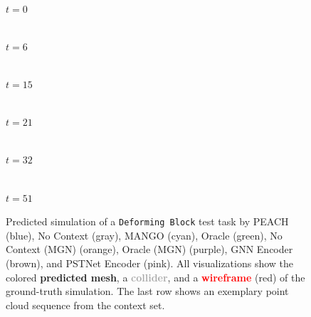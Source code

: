 \begin{figure}[p]
    \begin{minipage}[c]{0.158\textwidth}\centering
        \\[2pt]
        \footnotesize$t{=}0$
    \end{minipage}%
    \begin{minipage}[c]{0.158\textwidth}\centering
        \\[2pt]
        \footnotesize$t{=}6$
    \end{minipage}%
    \begin{minipage}[c]{0.158\textwidth}\centering
        \\[2pt]
        \footnotesize$t{=}15$
    \end{minipage}%
    \begin{minipage}[c]{0.158\textwidth}\centering
        \\[2pt]
        \footnotesize$t{=}21$
    \end{minipage}%
    \begin{minipage}[c]{0.158\textwidth}\centering
        \\[2pt]
        \footnotesize$t{=}32$
    \end{minipage}%
    \begin{minipage}[c]{0.158\textwidth}\centering
        \\[2pt]
        \footnotesize$t{=}51$
    \end{minipage}

    \par\vfill
    \caption{
Predicted simulation of a \texttt{Deforming Block} test task by
\textcolor{TabBlue}{PEACH} (blue),
\textcolor{TabGray}{No Context} (gray),
\textcolor{TabCyan}{MANGO} (cyan),
\textcolor{TabGreen}{Oracle} (green),
\textcolor{TabOrange}{No Context (MGN)} (orange),
\textcolor{TabPurple}{Oracle (MGN)} (purple),
\textcolor{TabBrown}{GNN Encoder} (brown), and
\textcolor{TabPink}{PSTNet Encoder} (pink).
All visualizations show the colored \textbf{predicted mesh}, a \textbf{\textcolor{darkgray}{collider}}, and a \textbf{\textcolor{red}{wireframe}} (red) of the ground-truth simulation. The last row shows an exemplary point cloud sequence from the context set.
    }
    \label{fig:qualitative_trajectories_db}
\end{figure}
